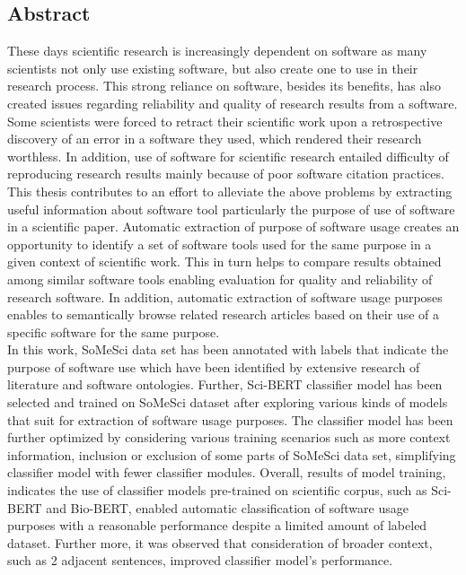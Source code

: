 

\begin{otherlanguage}{american}
	\chapter*{Abstract}

	\medskip
	
	\noindent

\end{otherlanguage}

These days scientific research is increasingly dependent on software as many scientists not only use existing software, but also create one to use in their research process. This strong reliance on software, besides its benefits, has also created issues regarding reliability and quality of research results from a software. Some scientists were forced to retract their scientific work upon a retrospective discovery of an error in a software they used, which rendered their research worthless. In addition, use of software for scientific research entailed difficulty of reproducing research results mainly because of poor software citation practices. \\

This thesis contributes to an effort to alleviate the above problems by extracting useful information about software tool particularly the purpose of use of software in a scientific paper. Automatic extraction of purpose of software usage creates an opportunity to identify a set of software tools used for the same purpose in a given context of scientific work. This in turn helps to compare results obtained among similar software tools enabling evaluation for quality and reliability of research software. In addition, automatic extraction of software usage purposes enables to semantically browse related research articles based on their use of a specific software for the same purpose. \\

In this work, SoMeSci data set has been annotated with labels that indicate the purpose of software use which have been identified by extensive research of literature and software ontologies. Further, Sci-BERT classifier model has been  selected and trained on SoMeSci dataset after exploring various kinds of models that suit for extraction of software usage purposes. The classifier model has been further optimized by considering various training scenarios such as more context information, inclusion or exclusion of some parts of SoMeSci data set, simplifying classifier model with fewer classifier modules. Overall, results of model training, indicates the use of classifier models pre-trained on scientific corpus, such as Sci-BERT and Bio-BERT, enabled automatic classification of software usage purposes with a reasonable performance despite a limited amount of labeled dataset. Further more, it was observed that consideration of broader context, such as 2 adjacent sentences, improved classifier model’s performance.
